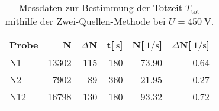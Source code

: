 
\begin{table}[!h]
\begin{center}
\begin{tabular}{|l|r|r|r|r|r|}
\hline
Probe & N & $\Delta$N & t[$\SI{}{\second}$] & N[$\SI{}{1\per\second}$] & $\Delta$N[$\SI{}{1\per\second}$]\\
\hline
\hline
N1 & 13302	& 115 & 180 & 73.90 & 0.64 \\
N2 & 7902	& 89  & 360 & 21.95 & 0.27 \\
N12 & 16798	& 130 & 180 & 93.32 & 0.72 \\
\hline
\end{tabular}
\caption[Aufgabe d]{Messdaten zur Bestimmung der Totzeit $T_\mathrm{tot}$ mithilfe der Zwei-Quellen-Methode bei $U = \SI{450}{\volt}$.}
\label{tabelled}
\end{center}
\end{table}